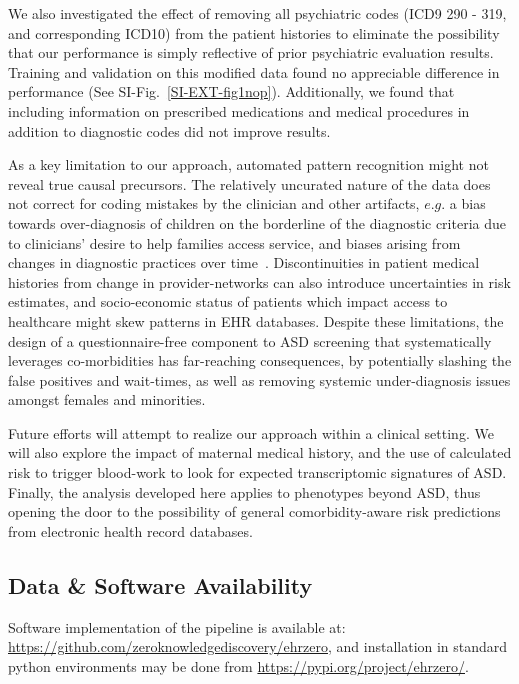 \documentclass[onecolumn,,10pt]{IEEEtran}
\begin{document}
We also investigated the effect of removing all psychiatric codes (ICD9 290 - 319, and corresponding ICD10) from the patient histories to eliminate the possibility that our performance is simply reflective of prior psychiatric evaluation results. Training and validation on this modified data found  no appreciable difference in performance (See SI-Fig.~\ref{SI-EXT-fig1nop}). Additionally, we found that including information on prescribed medications and medical procedures in addition to diagnostic codes did not improve results.

As a key limitation to our approach, automated pattern recognition  might not reveal true causal precursors. The relatively uncurated nature of the  data does not correct for coding mistakes by the clinician and other artifacts, $e.g.$   a bias towards over-diagnosis of  children on the borderline of the diagnostic criteria due to clinicians' desire to help families access service, and biases arising from changes in diagnostic practices over time~\cite{10.1001/jamapsychiatry.2019.1956}. Discontinuities in patient medical histories from change in provider-networks  can also introduce  uncertainties  in risk estimates, and socio-economic status of patients which impact access to healthcare  might skew patterns in EHR databases. Despite these limitations, the design of a questionnaire-free component to ASD screening  that systematically leverages co-morbidities  has far-reaching consequences, by potentially slashing the false positives and wait-times, as well as removing systemic under-diagnosis issues amongst females and minorities. 

Future efforts will attempt to realize our approach within a clinical setting. We will also explore the impact of  maternal medical history, and the  use of calculated risk to trigger   blood-work to look for expected  transcriptomic  signatures of ASD. Finally,  the analysis developed here applies to phenotypes beyond ASD, thus opening the door to the possibility of  general  comorbidity-aware risk predictions  from electronic health record databases.


\subsection*{Data \& Software Availability} Software implementation of the pipeline is available at: \href{https://github.com/zeroknowledgediscovery/ehrzero}{https://github.com/zeroknowledgediscovery/ehrzero}, and installation in standard python environments
may be done from \href{https://pypi.org/project/ehrzero/}{https://pypi.org/project/ehrzero/}.
\end{document}
